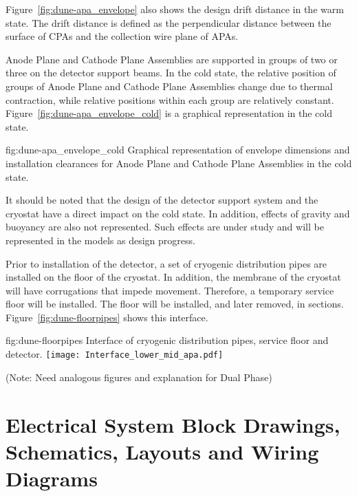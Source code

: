 Figure~\ref{fig:dune-apa_envelope} also shows the design drift
distance in the warm state. The drift distance is defined as the
perpendicular distance between the surface of CPAs and the collection
wire plane of APAs.


Anode Plane and Cathode Plane Assemblies are supported in groups of
two or three on the detector support beams.  In the cold state, the
relative position of groups of Anode Plane and Cathode Plane
Assemblies change due to thermal contraction, while relative positions
within each group are relatively
constant. Figure~\ref{fig:dune-apa_envelope_cold} is a graphical
representation in the cold state.
\begin{dunefigure}{fig:dune-apa_envelope_cold} {Graphical
    representation of envelope dimensions and installation clearances
    for Anode Plane and Cathode Plane Assemblies in the cold state.}
\end{dunefigure}

It should be noted that the design of the detector support system and
the cryostat have a direct impact on the cold state. In addition,
effects of gravity and buoyancy are also not represented. Such effects
are under study and will be represented in the models as design
progress.

Prior to installation of the detector, a set of cryogenic distribution
pipes are installed on the floor of the cryostat. In addition, the
membrane of the cryostat will have corrugations that impede
movement. Therefore, a temporary service floor will be installed. The
floor will be installed, and later removed, in
sections. Figure~\ref{fig:dune-floorpipes} shows this interface.

\begin{dunefigure}{fig:dune-floorpipes} 
{Interface of cryogenic distribution pipes, service floor and detector.}
  \texttt{[image: Interface\_lower\_mid\_apa.pdf]}
\end{dunefigure}


(Note: Need analogous figures and explanation for Dual Phase)


\section{Electrical System Block Drawings, Schematics, Layouts and Wiring Diagrams}
\label{sec:fdsp-coord-electrical}

